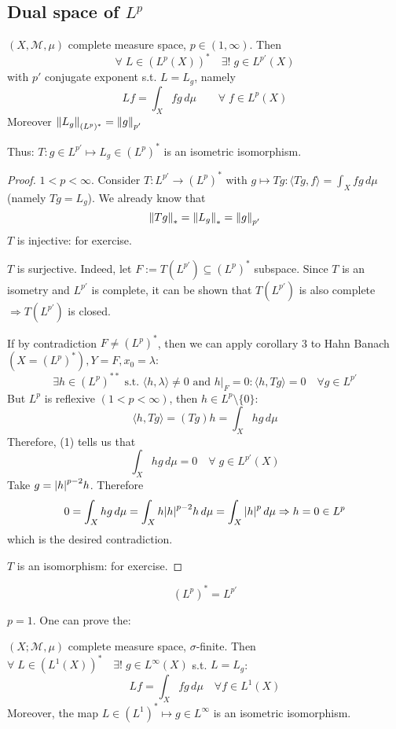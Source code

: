 \subsection*{Dual space of \(L^p\)}

\begin{theorem}
    \((X, \mathcal{M}, \mu)\) complete measure space, \(p \in (1, \infty)\). Then 
    \[
        \forall\; L \in (L^p(X))^* \quad \exists! \; g \in L^{p'}(X)
    \]
    with \(p' \) conjugate exponent s.t. \(L=L_g\), namely
    \[
        Lf = \int_X fg \, d\mu \qquad \forall\; f \in L^p(X)
    \]
    Moreover \(\norm{L_g}_{(L^p)^*} = \norm{g}_{p'}\)
    
    Thus: \(T: g \in L^{p'} \mapsto L_g \in (L^p)^*\) is an isometric isomorphism.
\end{theorem}
\begin{proof}
    \(1 < p < \infty\). Consider \(T: L^{p'} \to (L^p)^*\) with \(g \mapsto Tg: \langle Tg, f \rangle = \int_X fg \, d\mu\) (namely \(Tg = L_g\)). We already know that
    \[
        \norm{Tg}_* = \norm{L_g}_* = \norm{g}_{p'}
    \]
    \(T\) is injective: for exercise.

    \(T\) is surjective. Indeed, let \(F:= T(L^{p'}) \subseteq (L^p)^*\) subspace. Since \(T\) is an isometry and \(L^{p'}\) is complete, it can be shown that \(T(L^{p'})\) is also complete \(\Rightarrow T(L^{p'})\) is closed.

    If by contradiction \(F \neq (L^p)^*\), then we can apply corollary 3 to Hahn Banach \((X = (L^p)^*), Y=F, x_0 = \lambda\):
    \[
        \exists h \in (L^p)^{**} \text{ s.t. } \langle h, \lambda \rangle \neq 0 \text{ and } h|_F = 0: \langle h, Tg \rangle =0 \quad \forall g \in L^{p'} \tag*{1} 
    \]
    But \(L^p \) is reflexive \((1 <p < \infty)\), then \(h \in L^p \setminus \{0\}\):
    \[
        \langle h, Tg \rangle = (Tg)h = \int_X hg \, d\mu
    \]
    Therefore, (1) tells us that
    \[
        \int_X hg \, d\mu =0 \quad \forall \; g \in L^{p'}(X)
    \]
    Take \(g = \abs{h}^{p-2}h\). Therefore
    \[
        0 = \int_X hg \, d\mu = \int_X h \abs{h}^{p-2} h \, d\mu = \int_X \abs{h}^p \, d\mu \Rightarrow h=0 \in L^p
    \]
    which is the desired contradiction.

    \(T\) is an isomorphism: for exercise.
\end{proof}

\[
    (L^p)^* = L^{p'}
\]

\begin{remark}
    \(p=1\). One can prove the:
\end{remark}
\begin{theorem}
    \((X; \mathcal{M}, \mu)\) complete measure space, \(\sigma\)-finite.
    Then \(\forall\; L \in (L^1(X))^* \quad \exists! \; g \in L^\infty(X)\) s.t. \(L=L_g\):
    \[
        Lf = \int_X fg \, d\mu \quad \forall f \in L^1(X)
    \]
    Moreover, the map \(L \in (L^1)^* \mapsto g \in L^\infty\) is an isometric isomorphism.
\end{theorem}

